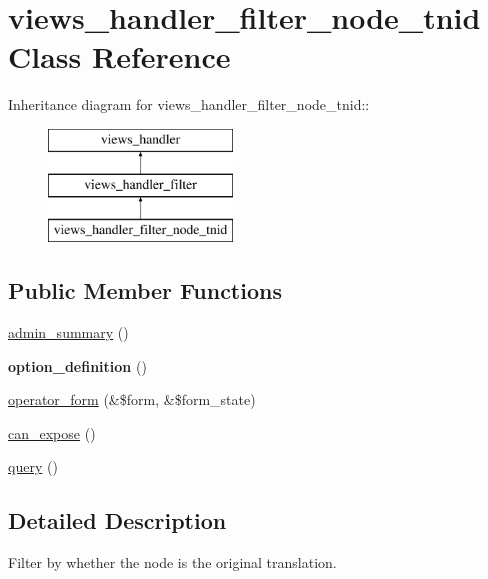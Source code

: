 \hypertarget{classviews__handler__filter__node__tnid}{
\section{views\_\-handler\_\-filter\_\-node\_\-tnid Class Reference}
\label{classviews__handler__filter__node__tnid}
}
Inheritance diagram for views\_\-handler\_\-filter\_\-node\_\-tnid::\begin{figure}[H]
\begin{center}
\leavevmode
\includegraphics[height=3cm]{classviews__handler__filter__node__tnid}
\end{center}
\end{figure}
\subsection*{Public Member Functions}
\begin{DoxyCompactItemize}
\item 
\hyperlink{classviews__handler__filter__node__tnid_a037932cf19297e4b8544c24747509823}{admin\_\-summary} ()
\item 
\hypertarget{classviews__handler__filter__node__tnid_aab1f73e93ba261fff47a93a698612e25}{
{\bfseries option\_\-definition} ()}
\label{classviews__handler__filter__node__tnid_aab1f73e93ba261fff47a93a698612e25}

\item 
\hyperlink{classviews__handler__filter__node__tnid_a92d26c1ecccc0a2985d4195a46c7e87b}{operator\_\-form} (\&\$form, \&\$form\_\-state)
\item 
\hyperlink{classviews__handler__filter__node__tnid_a9e6111d77af1aefee0b78d7b3b2c25cc}{can\_\-expose} ()
\item 
\hyperlink{classviews__handler__filter__node__tnid_a7e51dd45867a8a4a3c965a09d0ecd3b6}{query} ()
\end{DoxyCompactItemize}


\subsection{Detailed Description}
Filter by whether the node is the original translation. 

